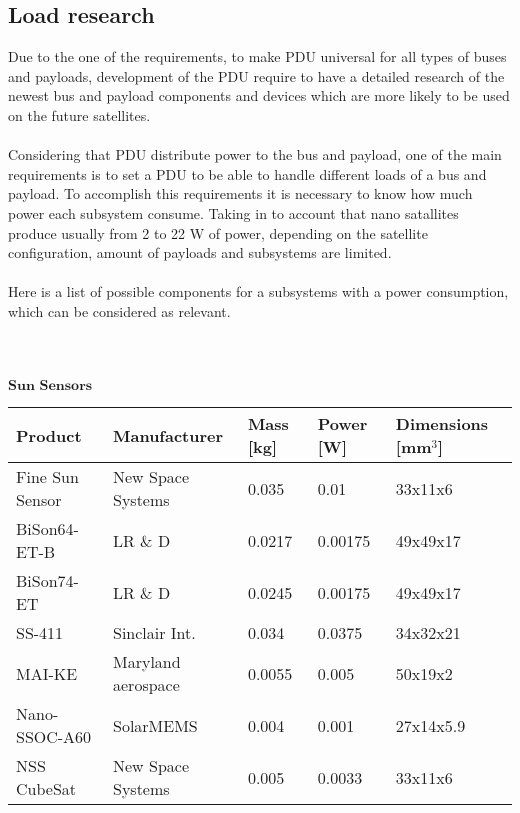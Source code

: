 \subsection{Load research\label{sec:aaa}}

Due to the one of the requirements, to make PDU universal for all types of buses and payloads, development of the PDU require to have a detailed research of the newest bus and payload components and devices which are more likely to be used on the future satellites.\\
\\
 Considering that PDU distribute power to the bus and payload, one of the main requirements is to set a PDU to be able to handle different loads of a bus and payload. To accomplish this requirements it is necessary to know how much power each subsystem consume. Taking in to account that nano satallites produce usually from 2 to 22 W of power, depending on the satellite configuration, amount of payloads and subsystems are limited. \\
 \\
 Here is a list of possible components for a subsystems with a power consumption, which can be considered as relevant. \\ \\ \\ \\
 
 $\textbf{Sun Sensors}$\\

 
 \begin{tabular}{p{3cm}p{3cm}p{2cm}p{2cm}p{2cm}} \toprule
 	Product & Manufacturer & Mass [kg] & Power [W]& Dimensions [mm$^{3}$]\\ \midrule
 	
 		Fine Sun Sensor & New Space Systems & 0.035 & 0.01 & 33x11x6 \\
 		
 		BiSon64-ET-B & LR \& D & 0.0217 & 0.00175 & 49x49x17 \\
 		
 		BiSon74-ET & LR \& D  & 0.0245 & 0.00175 & 49x49x17  \\
 		
 		SS-411 & Sinclair Int. & 0.034 & 0.0375 & 34x32x21 \\
 	
 		MAI-KE & Maryland aerospace & 0.0055 & 0.005 & 50x19x2 \\
 		
 		Nano-SSOC-A60 & SolarMEMS & 0.004 & 0.001 & 27x14x5.9 \\
 		
 		NSS CubeSat & New Space Systems & 0.005 & 0.0033 & 33x11x6  \\ \bottomrule
 		
 \end{tabular}\\ \\ \\ \\
       
